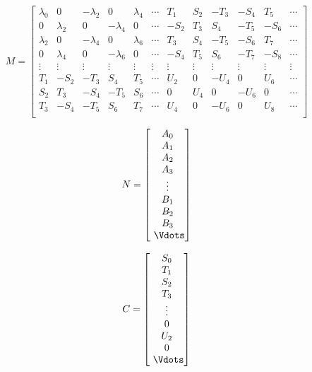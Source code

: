 \begin{equation}
M = 
\begin{bmatrix}
\lambda _0 & 0          & -\lambda _2 &  0           & \lambda _4  & \cdots &  T_1    & S_2    & -T_3   & -S_4   &  T_5    & \cdots \\
0          & \lambda _2 & 0           & -\lambda _4  & 0           & \cdots & -S_2    & T_3    &  S_4   & -T_5   & -S_6    & \cdots \\
\lambda _2 & 0          & -\lambda _4 &  0           & \lambda _6  & \cdots &  T_3    & S_4    & -T_5   & -S_6   &  T_7    & \cdots \\
0          & \lambda _4 & 0           & -\lambda _6  & 0           & \cdots & -S_4    & T_5    &  S_6   & -T_7   & -S_8    & \cdots \\

\vdots     & \vdots     &  \vdots     & \vdots       & \vdots      & \vdots &  \vdots & \vdots & \vdots & \vdots &  \vdots & \vdots \\ 
T_1        & -S_2       & -T_3        &  S_4         & T_5         & \cdots &  U_2    & 0      & -U_4   &  0     &  U_6    & \cdots \\
S_2        &  T_3       & -S_4        & -T_5         & S_6         & \cdots &  0      & U_4    &  0     & -U_6   &  0      & \cdots \\
T_3        & -S_4       & -T_5        &  S_6         & T_7         & \cdots &  U_4    & 0      & -U_6   &  0     &  U_8    & \cdots \\
\end{bmatrix}
\end{equation}

\begin{equation}
N = 
\begin{bmatrix}
A_0 \\
A_1 \\
A_2 \\
A_3 \\
\vdots \\
B_1 \\
B_2 \\
B_3 \\\
\Vdots
\end{bmatrix}
\end{equation}

\begin{equation}
C = 
\begin{bmatrix}
S_0 \\
T_1 \\
S_2 \\
T_3 \\
\vdots \\
0   \\
U_2 \\
0   \\\
\Vdots
\end{bmatrix}
\end{equation}

